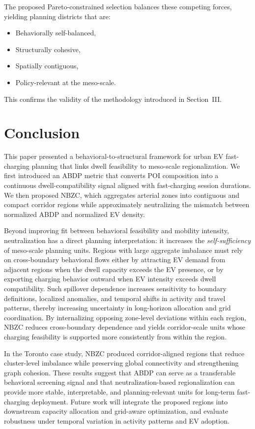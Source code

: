 \documentclass[conference]{IEEEtran}
\begin{document}
The proposed Pareto-constrained selection balances these competing forces, 
yielding planning districts that are:

\begin{itemize}
\item Behaviorally self-balanced,
\item Structurally cohesive,
\item Spatially contiguous,
\item Policy-relevant at the meso-scale.
\end{itemize}

This confirms the validity of the methodology introduced in Section~III.
\section{Conclusion}
This paper presented a behavioral-to-structural framework for urban EV
fast-charging planning that links dwell feasibility to meso-scale
regionalization. We first introduced an ABDP
metric that converts POI composition into a continuous dwell-compatibility
signal aligned with fast-charging session durations. We then proposed
NBZC, which aggregates arterial zones
into contiguous and compact corridor regions while approximately neutralizing the mismatch between normalized ABDP and normalized EV density.

Beyond improving fit between behavioral feasibility and mobility intensity,
neutralization has a direct planning interpretation: it increases the \emph{self-sufficiency} of meso-scale planning units. Regions with large
aggregate imbalance must rely on cross-boundary behavioral flows either by attracting EV demand from adjacent regions when the dwell capacity exceeds the EV
presence, or by exporting charging behavior outward when EV intensity exceeds dwell compatibility. Such spillover dependence increases sensitivity to
boundary definitions, localized anomalies, and temporal shifts in activity and
travel patterns, thereby increasing uncertainty in long-horizon allocation and
grid coordination. By internalizing opposing zone-level deviations within each
region, NBZC reduces cross-boundary dependence and yields corridor-scale units
whose charging feasibility is supported more consistently from within the
region.

In the Toronto case study, NBZC produced corridor-aligned regions that reduce
cluster-level imbalance while preserving global connectivity and strengthening graph cohesion. These results suggest that ABDP can serve as a transferable
behavioral screening signal and that neutralization-based regionalization can
provide more stable, interpretable, and planning-relevant units for long-term
fast-charging deployment. Future work will integrate the proposed regions into
downstream capacity allocation and grid-aware optimization, and evaluate
robustness under temporal variation in activity patterns and EV adoption. \cite{Annan2024}\cite{Katontoka2025}\cite{Zhang2025}\cite{Wang2023}\cite{Sun2024}\cite{Matkovic2024}\cite{Qin2026}\cite{Yuan2025}\cite{WANG_DENG_YAN_LI_2025}\cite{Zechao2024}





\end{document}
